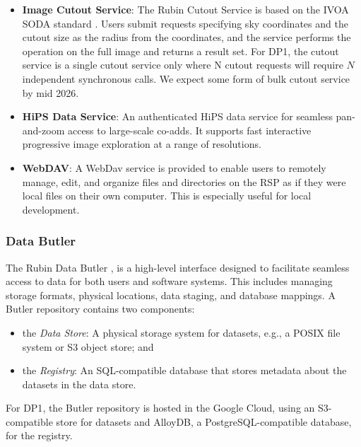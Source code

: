 \begin{itemize}
\vspace{0.1cm}
\item \textbf{Image Cutout Service}: The Rubin Cutout Service \citep{SQR-063, SQR-093} is based on the  IVOA SODA standard \citep{2017ivoa.spec.0517B}.
Users submit requests specifying sky coordinates and the cutout size as the radius from the coordinates, and the  service performs the operation on the full image and returns a result set.
For \gls{DP1}, the  cutout service is a single cutout service only where N cutout requests will require $N$ independent synchronous calls.
We expect some form of bulk cutout service by mid 2026.

\vspace{0.1cm}
\item \textbf{HiPS Data Service}: An authenticated \gls{HiPS}
\citep{2017ivoa.spec.0519F}
data service for seamless pan-and-zoom access to large-scale co-adds.
It supports fast interactive progressive image exploration at a range of resolutions.

\vspace{0.1cm}
\item \textbf{WebDAV}: A \gls{WebDav} service is provided to enable users to remotely manage, edit, and organize files and directories on the \gls{RSP} as if they were local files on their own computer. This is especially useful for local development.
\end{itemize}

\subsubsection{Data Butler}
\label{sssec:data_butler}

The Rubin Data Butler \citep{2022SPIE12189E..11J,2023arXiv230303313L},  is a high-level interface designed to facilitate seamless access to data for both users and software systems.
This includes managing storage formats, physical locations, data staging, and database mappings.
A \gls{Butler} repository contains two components:
\begin{itemize}
    \item the \emph{Data Store}: A physical storage system for datasets, e.g., a \gls{POSIX} file system or S3 object store; and
    \item the \emph{Registry}: An \gls{SQL}-compatible database that stores metadata about the datasets in the data store.
\end{itemize}
For \gls{DP1}, the Butler repository is hosted in the Google Cloud, using an \gls{S3}-compatible store for datasets and AlloyDB, a PostgreSQL-compatible database, for the registry.


